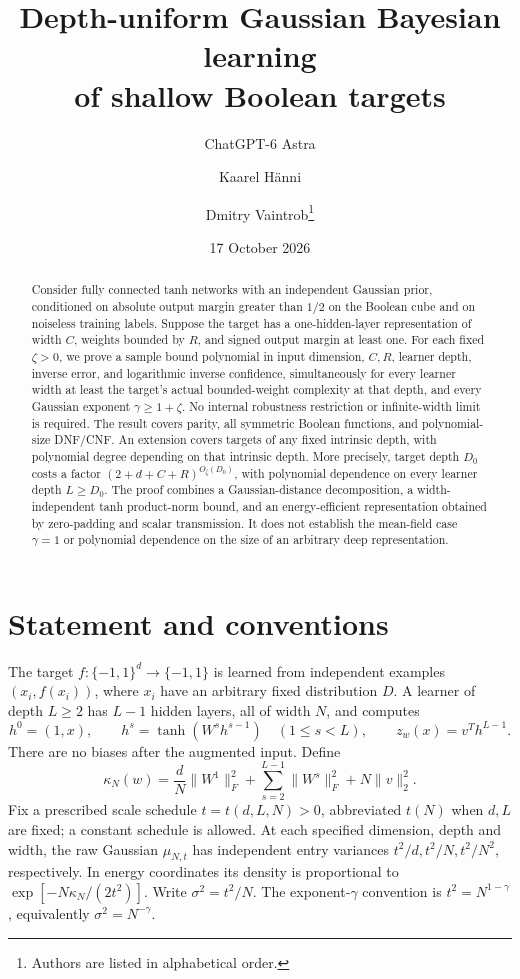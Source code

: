 \documentclass[11pt]{article}
\title{Depth-uniform Gaussian Bayesian learning\\of shallow Boolean targets}
\author{ChatGPT-6 Astra \and Kaarel H\"anni \and Dmitry Vaintrob\thanks{Authors are listed in alphabetical order.}}
\date{17 October 2026}
\begin{document}
\maketitle
\begin{abstract}
Consider fully connected tanh networks with an independent Gaussian prior,
conditioned on absolute output margin greater than $1/2$ on the Boolean
cube and on noiseless training labels. Suppose the target has a
one-hidden-layer representation of width $C$, weights bounded by $R$, and
signed output margin at least one. For each fixed $\zeta>0$, we prove a
sample bound polynomial in input dimension, $C,R$, learner depth, inverse
error, and logarithmic inverse confidence, simultaneously for every learner
width at least the target's actual bounded-weight complexity at that depth, and every
Gaussian exponent $\gamma\ge1+\zeta$. No internal robustness restriction
or infinite-width limit is required. The result covers parity, all
symmetric Boolean functions, and polynomial-size DNF/CNF. An extension
covers targets of any fixed intrinsic depth, with polynomial degree
depending on that intrinsic depth. More precisely, target depth $D_0$
costs a factor $(2+d+C+R)^{O_\zeta(D_0)}$, with polynomial dependence
on every learner depth $L\ge D_0$. The proof combines
a Gaussian-distance decomposition, a width-independent tanh product-norm
bound, and an energy-efficient representation obtained by zero-padding
and scalar transmission. It does not establish the mean-field case
$\gamma=1$ or polynomial dependence on the size of an arbitrary deep
representation.
\end{abstract}

\section{Statement and conventions}

The target $f:\{-1,1\}^d\to\{-1,1\}$ is learned from independent
examples $(x_i,f(x_i))$, where $x_i$ have an arbitrary fixed distribution
$D$. A learner of depth $L\ge2$ has $L-1$ hidden layers, all of width $N$,
and computes
\[
 h^0=(1,x),\qquad h^s=\tanh(W^sh^{s-1})\quad(1\le s<L),
 \qquad z_w(x)=v^Th^{L-1}.
\]
There are no biases after the augmented input. Define
\[
 \kappa_N(w)=\frac dN\|W^1\|_F^2+
    \sum_{s=2}^{L-1}\|W^s\|_F^2+N\|v\|_2^2.
\]
Fix a prescribed scale schedule $t=t(d,L,N)>0$, abbreviated $t(N)$
when $d,L$ are fixed; a constant schedule is allowed.
At each specified dimension, depth and width, the raw Gaussian
$\mu_{N,t}$ has independent entry variances
$t^2/d,t^2/N,t^2/N^2$, respectively. In energy coordinates its density is
proportional to $\exp[-N\kappa_N/(2t^2)]$.
Write $\sigma^2=t^2/N$. The exponent-$\gamma$ convention is
$t^2=N^{1-\gamma}$, equivalently $\sigma^2=N^{-\gamma}$.
\end{document}
